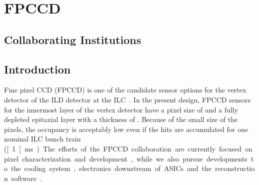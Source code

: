 \section{FPCCD}
\subsection{Collaborating Institutions}
\subsection{Introduction}
    Fine pixel CCD (FPCCD) is one of the candidate sensor options for the vertex detector of the ILD detector at the ILC~\cite{Sugimoto:2005ru,2009arXiv0902.2067S,2012arXiv1202.5832S}. In the present design, FPCCD sensors for the innermost layer of the vertex detector have a pixel size of \unit[5]{\micron} and a fully depleted epitaxial layer with a thickness of \unit[15]{\micron}. Because of the small size of the pixels, the occupancy is acceptably low even if the hits are accumulated for one nominal ILC bunch train (\unit[~1]{ms}).
    The efforts of the FPCCD collaboration are currently focused on pixel characterization and development, while we also pursue developments to the cooling system, electronics downstream of ASICs and the reconstruction software~\cite{Mori:2014xta}.
